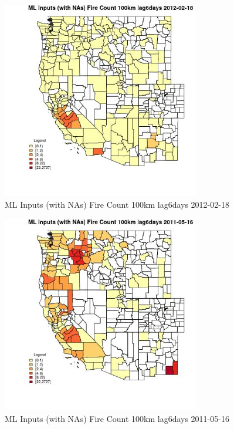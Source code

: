 \begin{figure} 
\centering  
\includegraphics[width=0.77\textwidth]{Code_Outputs/Report_ML_input_PM25_Step4_part_f_de_duplicated_aves_prioritize_24hr_obswNAs_CountyFire_Count_100km_lag6daysMean2012-02-18.jpg} 
\caption{\label{fig:Report_ML_input_PM25_Step4_part_f_de_duplicated_aves_prioritize_24hr_obswNAsCountyFire_Count_100km_lag6daysMean2012-02-18}ML Inputs (with NAs) Fire Count 100km lag6days 2012-02-18} 
\end{figure} 
 

\begin{figure} 
\centering  
\includegraphics[width=0.77\textwidth]{Code_Outputs/Report_ML_input_PM25_Step4_part_f_de_duplicated_aves_prioritize_24hr_obswNAs_CountyFire_Count_100km_lag6daysMean2011-05-16.jpg} 
\caption{\label{fig:Report_ML_input_PM25_Step4_part_f_de_duplicated_aves_prioritize_24hr_obswNAsCountyFire_Count_100km_lag6daysMean2011-05-16}ML Inputs (with NAs) Fire Count 100km lag6days 2011-05-16} 
\end{figure} 
 

